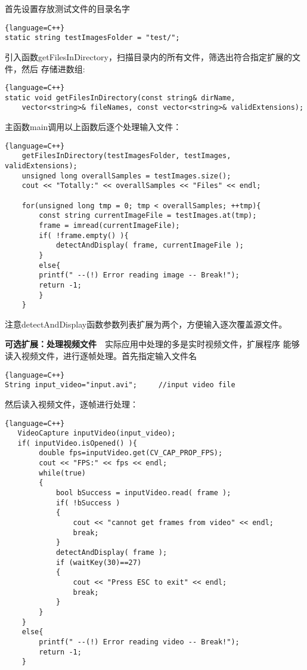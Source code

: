 首先设置存放测试文件的目录名字
\begin{lstlisting}{language=C++}
static string testImagesFolder = "test/";
\end{lstlisting}

引入函数\textsf{getFilesInDirectory}，扫描目录内的所有文件，筛选出符合指定扩展的文件，然后
存储进数组:
\begin{lstlisting}{language=C++}
static void getFilesInDirectory(const string& dirName,
    vector<string>& fileNames, const vector<string>& validExtensions);
\end{lstlisting}

主函数\textsf{main}调用以上函数后逐个处理输入文件：
\begin{lstlisting}{language=C++}
    getFilesInDirectory(testImagesFolder, testImages, validExtensions);
    unsigned long overallSamples = testImages.size();
    cout << "Totally:" << overallSamples << "Files" << endl;

    for(unsigned long tmp = 0; tmp < overallSamples; ++tmp){
        const string currentImageFile = testImages.at(tmp);
        frame = imread(currentImageFile);
        if( !frame.empty() ){
		    detectAndDisplay( frame, currentImageFile );
        }
        else{
		printf(" --(!) Error reading image -- Break!");
		return -1;
        }
	}
\end{lstlisting}

注意\textsf{detectAndDisplay}函数参数列表扩展为两个，方便输入逐次覆盖源文件。

\textbf{可选扩展：处理视频文件}~~实际应用中处理的多是实时视频文件，扩展程序
能够读入视频文件，进行逐帧处理。首先指定输入文件名
\begin{lstlisting}{language=C++}
String input_video="input.avi";     //input video file
\end{lstlisting}
然后读入视频文件，逐帧进行处理：
\begin{lstlisting}{language=C++}
   VideoCapture inputVideo(input_video);
   if( inputVideo.isOpened() ){
        double fps=inputVideo.get(CV_CAP_PROP_FPS);
        cout << "FPS:" << fps << endl;
		while(true)
        {
            bool bSuccess = inputVideo.read( frame );
            if( !bSuccess )
            {
                cout << "cannot get frames from video" << endl;
                break;
            }
            detectAndDisplay( frame );
            if (waitKey(30)==27)
            {
                cout << "Press ESC to exit" << endl;
                break;
            }
        }
	}
    else{
		printf(" --(!) Error reading video -- Break!");
		return -1;
	}
\end{lstlisting}

